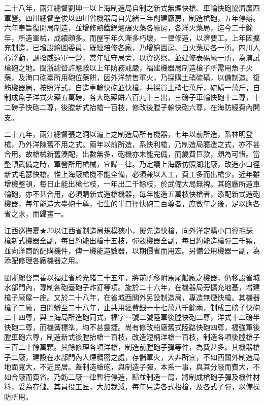 \begin{pinyinscope}
二十八年，兩江總督劉坤一以上海制造局自制之新式無煙快槍、車輪快砲協濟廣西軍營。四川總督奎俊以四川省機器局自光緒三年創建廠房，制造槍砲，五年停辦。六年奉旨復開局制造，並增修熟鐵鍋爐碾火藥各廠房，各洋火藥局，迄今二十餘年，所造軍械，成績頗多。而屋宇年久漸多朽壞，一律修造，以濟要工。上年因擴充制造，已增設繪圖委員，既經培修各廠，乃增繪圖房、白火藥房各一所。四川人心浮動，調撥威遠軍一營，常年駐守局旁，以資巡察。並建修表碼廠一所，為演試槍砲之地。閩浙總督許應騤以上年防務戒嚴，福建機器局制造槍子所需用魚子火藥，及海口砲臺所用砲位藥餅，因外洋禁售軍火，乃採購土硝硫磺，以備制造。復飭機器局，按照洋式，自造車輪快砲並快槍，共採買土硝七萬斤，硫磺一萬斤，自制成魚子洋式火藥五萬磅，各大砲藥餅六百九十三出，三磅子車輪快砲十二尊，十二磅子快砲二尊，後膛新式抬槍一百枝，修改後膛子輪快砲六尊，在海防經費內開支。

二十九年，兩江總督張之洞以滬上之制造局所有機器，七年以前所造，系林明登槍，乃外洋陳舊不用之式。兩年以前所造，系快利槍，乃制造局臆造之式，亦不甚合用。故槍械新舊湊配，出數無多，砲機亦未能完備，而歲費巨款，頗為可惜。當整頓武備之時，軍營所用槍械，宜歸一律。乃定議上海廠仿照湖北廠，改造小口徑新式毛瑟快槍。惟上海廠槍機不能全備，必須兼以人工，費工多而出槍少。近年雖增機整頓，每日止能出槍七枝，一年出二千餘枝，於武備大局無裨。其砲廠所造車輪砲，亦不甚合用，必須購新式造槍機器，每年能造五萬枝快槍者，添配新式造砲機器，每年能造大臺砲十尊，七生的半口徑快砲二百尊者，庶數年之後，足以應各省之求，而歸畫一。

江西巡撫夏★J9以江西省制造局規模狹小，擬先造快槍，向外洋定購小口徑毛瑟槍新式機器全副，每日約能出槍十五枝，彈殼機器全副，每日約能造槍彈三千顆，並向洋商酌配購機件，俾一機能造數器，以期價省而用宏。另備公用機器一副，為添配修理各廠機器之用。

閩浙總督崇善以福建省於光緒二十五年，將前所移附馬尾船廠之機器，仍移設省城水部門內，專制各砲臺砲子炸釘等項。旋於二十六年，在機器局旁擴充地基，增建槍子廠屋一座。又於二十八年，在省城西關外另設制造局，專造無煙快槍。其機器槍子二廠，自開辦至二十八年，止共用經費銀一十七萬八千餘兩，制成三磅子快砲二十四尊，與上海局所造砲同式，福字一號二號陸軍後膛快砲二尊，洋式十二磅半快砲二尊，而機簧標準，均不甚靈捷。尚有修改船廠舊式陸路快砲四尊，福強軍後膛車砲六尊，制造新式後膛抬槍一百枝，改造短柄洋槍一百枝，制造各項後膛槍子三百二十餘萬顆。其餘修理各項洋槍，制造前膛砲子彈等件，為費甚多。其機器槍子二廠，建設在水部門內人煙稠密之處，存儲軍火，大非所宜，不如西關外制造局地面寬大，不近民居。蓋制造槍砲，與制造子彈，本系一事，與其分廠而費大，不如合廠而費省。乃飭二廠一律暫行停造，歸並制造一局，將制成槍砲子彈及機件材料，妥為存儲。其員役工匠，大加裁減，每年只造各式抬槍，及各式子彈，以備操防所用。


\end{pinyinscope}
